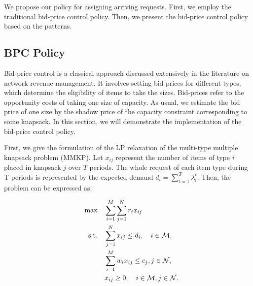 We propose our policy for assigning arriving requests. First, we employ the traditional bid-price control policy. Then, we present the bid-price control policy based on the patterns.




\subsection{BPC Policy}
Bid-price control is a classical approach discussed extensively in the literature on network revenue management. It involves setting bid prices for different types, which determine the eligibility of items to take the sizes. Bid-prices refer to the opportunity costs of taking one size of capacity. As usual, we estimate the bid price of one size by the shadow price of the capacity constraint corresponding to some knapsack. In this section, we will demonstrate the implementation of the bid-price control policy. 

First, we give the formulation of the LP relaxation of the multi-type multiple knapsack problem (MMKP). Let $x_{ij}$ represent the number of items of type $i$ placed in knapsack $j$ over $T$ periods. The whole request of each item type during T periods is represented by the expected demand $d_i = \sum_{t=1}^{T} \lambda^{t}_{i}$. Then, the problem can be expressed as:

\begin{align}
\quad \max \quad & \sum_{i=1}^{M}  \sum_{j= 1}^{N} r_{i} x_{ij} \label{e0} \\
\text {s.t.} \quad & \sum_{j= 1}^{N} x_{ij} \leq d_{i}, \quad i \in \mathcal{M}, \label{deter_upper}\\ 
& \sum_{i=1}^{M} w_{i} x_{ij} \leq c_j, j \in \mathcal{N}, \label{capa_con} \\
& x_{ij} \geq 0, \quad i \in \mathcal{M}, j \in \mathcal{N}. \notag
\end{align}

